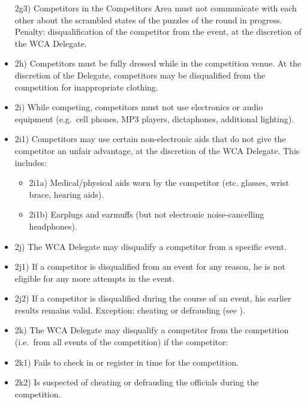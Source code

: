 \begin{itemize}
  2g3) Competitors in the Competitors Area must not communicate with
  each other about the scrambled states of the puzzles of the round in
  progress. Penalty: disqualification of the competitor from the event,
  at the discretion of the WCA Delegate.
\item
  2h) Competitors must be fully dressed while in the competition venue.
  At the discretion of the Delegate, competitors may be disqualified
  from the competition for inappropriate clothing.
\item
  2i) While competing, competitors must not use electronics or audio
  equipment (e.g.~cell phones, MP3 players, dictaphones, additional
  lighting).
\item
  2i1) Competitors may use certain non-electronic aids that do not give
  the competitor an unfair advantage, at the discretion of the WCA
  Delegate. This includes:

  \begin{itemize}
  \item
    2i1a) Medical/physical aids worn by the competitor (etc. glasses,
    wrist brace, hearing aids).
  \item
    2i1b) Earplugs and earmuffs (but not electronic noise-cancelling
    headphones).
  \end{itemize}
\item
  2j) The WCA Delegate may disqualify a competitor from a specific
  event.
\item
  2j1) If a competitor is disqualified from an event for any reason, he
  is not eligible for any more attempts in the event.
\item
  2j2) If a competitor is disqualified during the course of an event,
  his earlier results remains valid. Exception: cheating or defrauding
  (see ).
\item
  2k) The WCA Delegate may disqualify a competitor from the competition
  (i.e.~from all events of the competition) if the competitor:
\item
  2k1) Fails to check in or register in time for the competition.
\item
  2k2) Is suspected of cheating or defrauding the officials during the
  competition.


\end{itemize}

